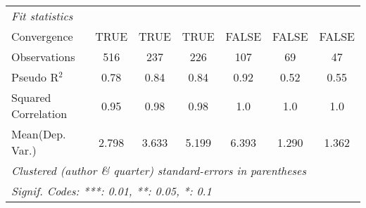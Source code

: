 \begin{tabular}{lcccccc}
   \midrule
   \emph{Fit statistics}\\
   Convergence                                                &TRUE          & TRUE    & TRUE         & FALSE         & FALSE        & FALSE\\  
   Observations                                               & 516          & 237     & 226          & 107           & 69           & 47\\  
   Pseudo R$^2$                                               & 0.78         & 0.84    & 0.84         & 0.92          & 0.52         & 0.55\\  
   Squared Correlation                                        & 0.95         & 0.98    & 0.98         & 1.0           & 1.0          & 1.0\\  
Mean(Dep. Var.) & 2.798 & 3.633 & 5.199 & 6.393 & 1.290 & 1.362 \\
   \midrule \midrule
   \multicolumn{7}{l}{\emph{Clustered (author \& quarter) standard-errors in parentheses}}\\
   \multicolumn{7}{l}{\emph{Signif. Codes: ***: 0.01, **: 0.05, *: 0.1}}\\
\end{tabular}
\par\endgroup
